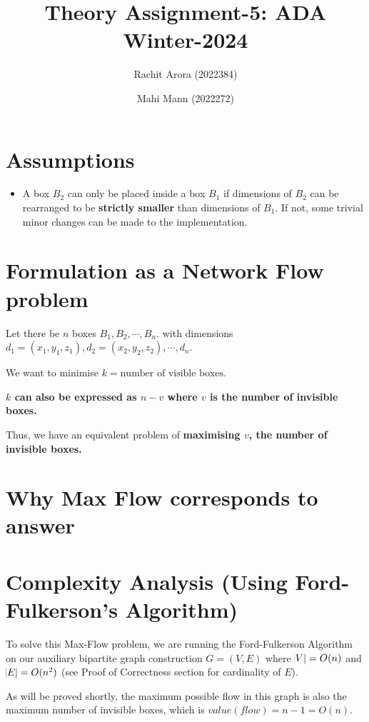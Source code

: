 \documentclass{article}
\title{Theory Assignment-5: ADA Winter-2024}
\author{Rachit Arora (2022384) \and Mahi Mann (2022272)}
\date{}
\begin{document}

\maketitle

\section{Assumptions}

\begin{itemize}
    \item A box $B_2$ can only be placed inside a box $B_1$ if dimensions of $B_2$ can be rearranged to be \textbf{strictly smaller} than dimensions of $B_1$. If not, some trivial minor changes can be made to the implementation. 
\end{itemize}

\section{Formulation as a Network Flow problem}

Let there be $n$ boxes $B_1, B_2, \cdots, B_n$. with dimensions $d_1 = (x_1, y_1, z_1), d_2 = (x_2, y_2, z_2), \cdots, d_n$.

We want to minimise $k = \text{number of visible boxes}$. 

\textbf{$k$ can also be expressed as $n - v$ where $v$ is the number of invisible boxes.}

Thus, we have an equivalent problem of \textbf{maximising $v$, the number of invisible boxes.} 

\section{Why Max Flow corresponds to answer}


\section{Complexity Analysis (Using Ford-Fulkerson's Algorithm)}

To solve this Max-Flow problem, we are running the Ford-Fulkerson Algorithm on our auxiliary bipartite graph construction $G = (V, E)$ where $\abs{V} = O(n)$ and $\abs{E} = O(n^2)$ (see Proof of Correctness section for cardinality of $E$).

As will be proved shortly, the maximum possible flow in this graph is also the maximum number of invisible boxes, which is $value(flow) = n-1 = O(n)$. 
\end{document}
